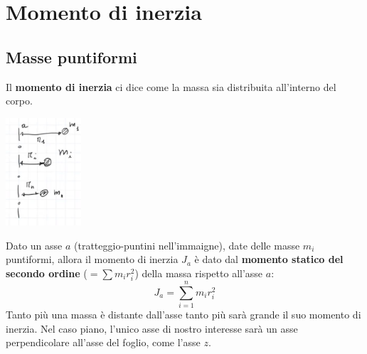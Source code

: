\section{Momento di inerzia}
\subsection{Masse puntiformi}
Il \textbf{momento di inerzia} ci dice come la massa sia distribuita all'interno del corpo.\newline
{}
\begin{center}
    \includegraphics[height=4cm]{../lezione8/img3.JPG}
\end{center}
Dato un asse $a$ (tratteggio-puntini nell'immaigne), date delle masse $m_i$ puntiformi, allora il momento di inerzia $J_a$ è dato dal \textbf{momento statico del secondo ordine} ($= \sum m_i r_i^2$)  della massa rispetto all'asse $a$:
\[
    J_a = \sum_{i=1}^{n} m_i r_i^2
\]
Tanto più una massa è distante dall'asse tanto più sarà grande il suo momento di inerzia.\newline
\newline
Nel caso piano, l'unico asse di nostro interesse sarà un asse perpendicolare all'asse del foglio, come l'asse $z$.
